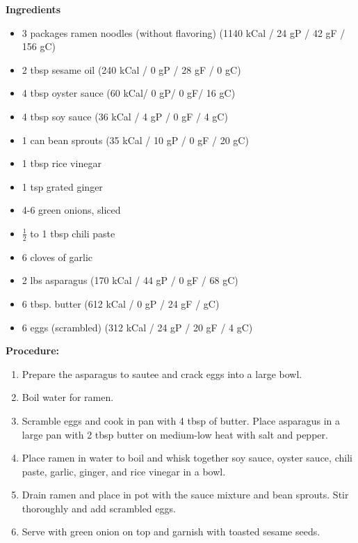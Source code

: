 \documentclass{report}
\begin{document}


\bigskip

\bigskip

\begin{multicols}{2}
\textbf{Ingredients}
\begin{itemize}
\item 3 packages ramen noodles (without flavoring) \newline (1140 kCal / 24 gP / 42 gF / 156 gC)
\item 2 tbsp sesame oil \quad (240 kCal / 0 gP / 28 gF / 0 gC)
\item 4 tbsp oyster sauce (60 kCal/ 0 gP/ 0 gF/ 16 gC)
\item 4 tbsp soy sauce \quad (36 kCal / 4 gP / 0 gF / 4 gC)
\item 1 can bean sprouts \quad (35 kCal / 10 gP / 0 gF / 20 gC)
\item 1 tbsp rice vinegar 
\item 1 tsp grated ginger
\item 4-6 green onions, sliced
\item $\frac{1}{2}$ to 1 tbsp chili paste 
\item 6 cloves of garlic
\item 2 lbs asparagus \quad (170 kCal / 44 gP / 0 gF / 68 gC)
\item 6 tbsp. butter  \quad (612 kCal / 0 gP / 24 gF /  gC)
\item 6 eggs (scrambled) \quad (312 kCal / 24 gP / 20 gF / 4 gC) 




\end{itemize}


\columnbreak
\textbf{Procedure:}
\medskip


\begin{enumerate}

\item Prepare the asparagus to sautee and crack eggs into a large bowl.
\item Boil water for ramen. 
\item Scramble eggs and cook in pan with 4 tbsp of butter. Place asparagus in a large pan with 2 tbsp butter on medium-low heat with salt and pepper. 
\item Place ramen in water to boil and whisk together soy sauce, oyster sauce, chili paste, garlic, ginger, and rice vinegar in a bowl. 
\item Drain ramen and place in pot with the sauce mixture and bean sprouts. Stir thoroughly and add scrambled eggs. 
\item Serve with green onion on top and garnish with toasted sesame seeds. 




\end{enumerate}
\end{multicols}
\end{document}
